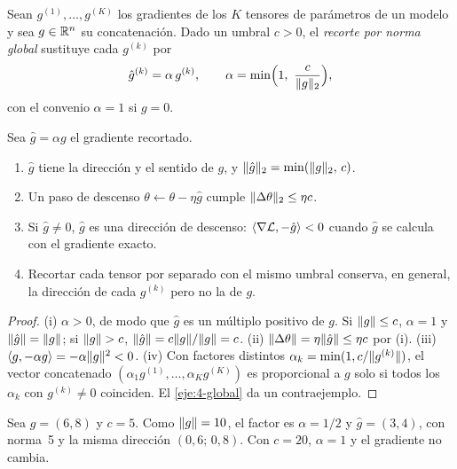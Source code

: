 \begin{definicion}\label{def:recorte}
Sean $g^{(1)},\dots,g^{(K)}$ los gradientes de los $K$ tensores de parámetros de un modelo y sea $g\in\mathbb{R}^{n}$ su concatenación. Dado un umbral $c>0$, el \emph{recorte por norma global} sustituye cada $g^{(k)}$ por
\[
\hat g^{(k)}=\alpha\,g^{(k)},\qquad \alpha=\min\Bigl(1,\ \frac{c}{\lVert g\rVert_2}\Bigr),
\]
con el convenio $\alpha=1$ si $g=0$.
\end{definicion}

\begin{proposicion}\label{prop:recorte}
Sea $\hat g=\alpha g$ el gradiente recortado.
\begin{enumerate}
  \item $\hat g$ tiene la dirección y el sentido de $g$, y $\lVert\hat g\rVert_2=\min(\lVert g\rVert_2,\,c)$.
  \item Un paso de descenso $\theta\leftarrow\theta-\eta\hat g$ cumple $\lVert\Delta\theta\rVert_2\le\eta c$.
  \item Si $\hat g\ne 0$, $\hat g$ es una dirección de descenso: $\langle\nabla\mathcal{L},-\hat g\rangle<0$ cuando $\hat g$ se calcula con el gradiente exacto.
  \item Recortar cada tensor por separado con el mismo umbral conserva, en general, la dirección de cada $g^{(k)}$ pero no la de $g$.
\end{enumerate}
\end{proposicion}

\begin{proof}
(i) $\alpha>0$, de modo que $\hat g$ es un múltiplo positivo de $g$. Si $\lVert g\rVert\le c$, $\alpha=1$ y $\lVert\hat g\rVert=\lVert g\rVert$; si $\lVert g\rVert>c$, $\lVert\hat g\rVert=c\lVert g\rVert/\lVert g\rVert=c$. (ii) $\lVert\Delta\theta\rVert=\eta\lVert\hat g\rVert\le\eta c$ por (i). (iii) $\langle g,-\alpha g\rangle=-\alpha\lVert g\rVert^{2}<0$. (iv) Con factores distintos $\alpha_k=\min(1,c/\lVert g^{(k)}\rVert)$, el vector concatenado $(\alpha_1g^{(1)},\dots,\alpha_Kg^{(K)})$ es proporcional a $g$ solo si todos los $\alpha_k$ con $g^{(k)}\ne 0$ coinciden. El \cref{eje:4-global} da un contraejemplo.
\end{proof}

\begin{ejemplo}\label{ej:recorte}
Sea $g=(6,8)$ y $c=5$. Como $\lVert g\rVert=10$, el factor es $\alpha=1/2$ y $\hat g=(3,4)$, con norma~5 y la misma dirección $(0{,}6;\,0{,}8)$. Con $c=20$, $\alpha=1$ y el gradiente no cambia.
\end{ejemplo}

